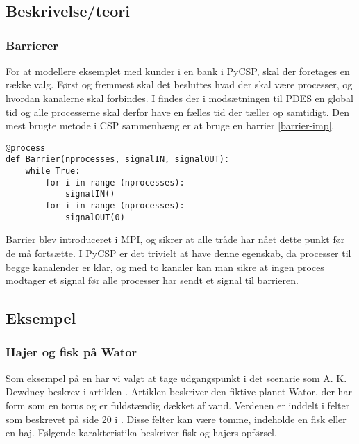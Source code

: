 \chapter{\des}
  \section{Beskrivelse/teori}
    
\subsection*{Barrierer}\label{barrier}
For at modellere eksemplet med kunder i en bank i PyCSP, skal der foretages en 
række valg. Først og fremmest skal det besluttes hvad der skal være processer, 
og hvordan  kanalerne skal forbindes. I \des findes der i modsætningen til 
PDES  en global tid og alle processerne skal derfor have  en 
fælles tid der tæller op samtidigt. Den mest brugte metode i CSP sammenhæng er 
at bruge en barrier \vref{barrier-imp}.

\begin{lstlisting}[label=barrier-imp,caption=En barrier i PyCSP]
@process
def Barrier(nprocesses, signalIN, signalOUT):
	while True:
		for i in range (nprocesses):
			signalIN()
		for i in range (nprocesses):
			signalOUT(0)
\end{lstlisting}

Barrier blev introduceret i MPI, og sikrer at alle tråde har nået dette punkt 
før de må fortsætte. I PyCSP er det trivielt at have  denne egenskab, da 
processer til begge kanalender er klar, og med to kanaler kan man sikre at 
ingen proces modtager et signal før alle processer har sendt et signal til 
barrieren.

\section{Eksempel}


\subsection{Hajer og fisk på Wator} Som eksempel på en \des har vi valgt at tage 
udgangspunkt i det scenarie som A. K. Dewdney
beskrev i artiklen \cite{wator}. Artiklen beskriver den
fiktive planet Wator, der har form som en torus og er fuldstændig
dækket af vand. Verdenen er inddelt i felter som beskrevet på side
20 i \cite{wator}. Disse felter kan være tomme, indeholde en
fisk eller en haj. Følgende karakteristika beskriver fisk og hajers
opførsel.



